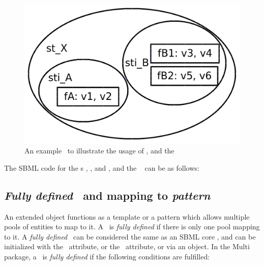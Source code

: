 \begin{figure}[htb]
  \begin{center}
    \includegraphics[scale=0.22]{./figs/diagram_ListOfSpeciesFeatures.png}
    \caption{An example \speciesFeatureType\ to illustrate the usage of \ListOfSpeciesFeatures, \SubListOfSpeciesFeatures and the \SpeciesFeature}
  \label{fig:ListOfSpeciesFeaturesExample}
  \end{center}
\end{figure}

The SBML code for the \speciesType s , , and , and the \species\  can be as follows:


\clearpage

\subsection{\emph{Fully defined} \species\ and mapping to \emph{pattern} \species}
\label{def:Species:FullyDefined}

An extended \ExSpecies object functions as a template or a pattern which allows multiple pools of entities to map to it. A \species\ is \emph{fully defined} if there is only one pool mapping to it. A \emph{fully defined} \species\ can be considered the same as an SBML core \species, and can be initialized with the \initialAmountAtt\ attribute, or the \initialConcentrationAtt\ attribute, or via an \InitialAssignment object. In the Multi package, a \species\ is \emph{fully defined} if the following conditions are fulfilled:

